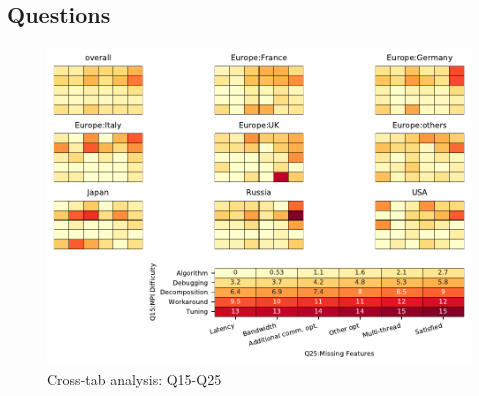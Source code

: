 
\subsection{Questions}


\begin{figure}
\begin{center}
\includegraphics[width=12cm]{../pdfs/Q15-Q25.pdf}
\caption{Cross-tab analysis: Q15-Q25}
\label{fig:Q15-Q25}
\end{center}
\end{figure}

